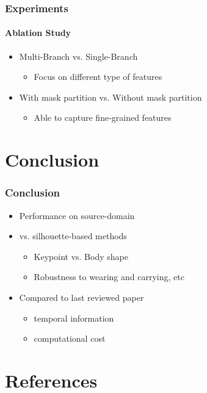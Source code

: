 \documentclass[
	12pt, %
	aspectratio=169, %
]{beamer}
\begin{document}
\begin{frame}
	\frametitle{Experiments}
	\framesubtitle{Ablation Study}

	\begin{itemize}
		\item Multi-Branch vs. Single-Branch
		\begin{itemize}
			\item Focus on different type of features
		\end{itemize}
		\item With mask partition vs. Without mask partition
		\begin{itemize}
			\item Able to capture fine-grained features
		\end{itemize}
	\end{itemize}
\end{frame}


\section{Conclusion}

\begin{frame}
	\frametitle{Conclusion}

	\begin{itemize}
		\item Performance on source-domain
		\item vs. silhouette-based methods
		\begin{itemize}
			\item Keypoint vs. Body shape
			\item Robustness to wearing and carrying, etc
		\end{itemize}
		\item Compared to last reviewed paper
		\begin{itemize}
			\item temporal information
			\item computational cost
		\end{itemize}
	\end{itemize}
\end{frame}


\section{References}
\end{document}
